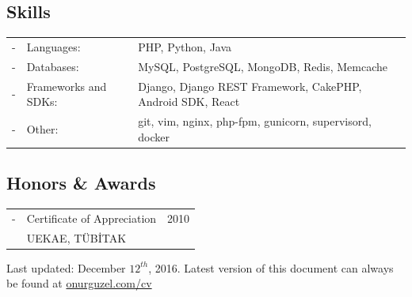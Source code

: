 \documentclass[11pt,a4paper]{article}
\begin{document}
\subsection*{Skills}
\begin{tabularx}{\textwidth}{l l X}
- & Languages: & PHP, Python, Java\\
- & Databases: & MySQL, PostgreSQL, MongoDB, Redis, Memcache\\
- & Frameworks and SDKs: & Django, Django REST Framework, CakePHP, Android SDK, React\\
- & Other: & git, vim, nginx, php-fpm, gunicorn, supervisord, docker
\end{tabularx}

\subsection*{Honors \& Awards}
\begin{tabularx}{\textwidth}{l X r}
- & Certificate of Appreciation & 2010\\
& UEKAE, TÜBİTAK
\end{tabularx}

\vspace{10pt}
\footnotesize {\color[gray]{0.25} Last updated: December $12^{th}$, 2016. Latest version of this document can always be found at \href{http://onurguzel.com/cv}{\color{black}onurguzel.com/cv}}
\end{document}
